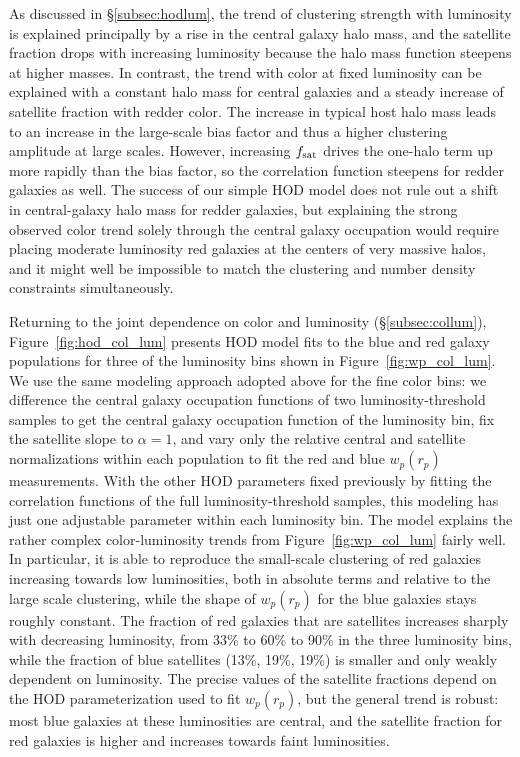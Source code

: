 \documentclass[]{emulateapj}
\newcommand{\wrp}{{w_p(r_p)}}
\def\fsat{f_{\rm sat}}
\begin{document}
As discussed in \S\ref{subsec:hodlum}, the trend of clustering strength
with luminosity is explained principally by a rise in the central galaxy
halo mass, and the satellite fraction drops with increasing luminosity
because the halo mass function steepens at higher masses.  In contrast,
the trend with color at fixed luminosity can be explained with a constant
halo mass for central galaxies and a steady increase of satellite
fraction with redder color.  The increase in typical host halo mass leads
to an increase in the large-scale bias factor and thus a higher
clustering amplitude at large scales.  However, increasing $\fsat$
drives the one-halo term up more rapidly than the bias
factor, so the correlation function steepens for redder galaxies
as well.  The success of our simple HOD model does not rule out a
shift in central-galaxy halo mass for redder galaxies, but explaining
the strong observed color trend solely through the central galaxy occupation
would require placing moderate luminosity red galaxies at the centers of 
very massive halos, and it might well be impossible to match the
clustering and number density constraints simultaneously.

Returning to the joint dependence on color and luminosity 
(\S\ref{subsec:collum}),
Figure~\ref{fig:hod_col_lum} presents HOD model fits to the blue and
red galaxy populations for three of the luminosity bins shown in
Figure~\ref{fig:wp_col_lum}.  We use the same modeling approach adopted
above for the fine color bins: we difference the central galaxy occupation
functions of two luminosity-threshold samples to get the central galaxy
occupation function of the luminosity bin, fix the satellite slope
to $\alpha=1$, and vary only the relative central and satellite
normalizations within each population to fit the red and blue
$\wrp$ measurements.
With the other HOD parameters fixed previously by fitting the
correlation functions of the full luminosity-threshold samples,
this modeling has just one adjustable parameter within each luminosity
bin.  The model explains the rather complex color-luminosity trends 
from Figure~\ref{fig:wp_col_lum} fairly well. In particular, it is
able to reproduce the 
small-scale clustering of red galaxies increasing towards
low luminosities, both in absolute terms and relative to the large
scale clustering, while the shape of $\wrp$ for the blue galaxies
stays roughly constant.  The fraction of red galaxies that are 
satellites increases sharply with decreasing luminosity, from
33\% to 60\% to 90\% in the three luminosity bins, while the fraction 
of blue satellites (13\%, 19\%, 19\%) is smaller and only weakly dependent 
on luminosity.  The precise values of the satellite fractions depend
on the HOD parameterization used to fit $\wrp$, but the general trend
is robust: most blue galaxies at these luminosities are central, and 
the satellite fraction for red galaxies is higher and increases towards
faint luminosities.  
\end{document}
